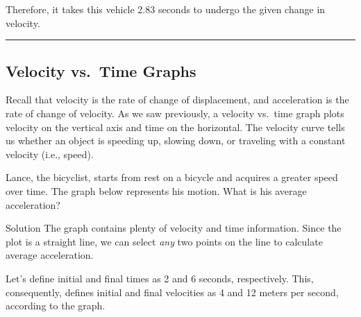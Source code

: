 \documentclass[dvipsnames]{article}
\begin{document}
Therefore, it takes this vehicle 2.83 seconds to undergo the given change in velocity.

\hrule


\subsection{Velocity vs.~Time Graphs}

Recall that velocity is the rate of change of displacement, and acceleration is the rate of change of velocity. As we saw previously, a velocity vs.~time graph plots velocity on the vertical axis and time on the horizontal. The velocity curve tells us whether an object is speeding up, slowing down, or traveling with a constant velocity (i.e., speed).


\begin{example} \label{AbDF59}
    Lance, the bicyclist, starts from rest on a bicycle and acquires a greater speed over time. The graph below represents his motion. What is his average acceleration?
\end{example}


\begin{center}
\end{center}

Solution The graph contains plenty of velocity and time information. Since the plot is a straight line, we can select \textit{any} two points on the line to calculate average acceleration. 

\vspace{1em}

Let's define initial and final times as 2 and 6 seconds, respectively. This, consequently, defines initial and final velocities as 4 and 12 meters per second, according to the graph.

\begin{center}
\end{center}
\end{document}
